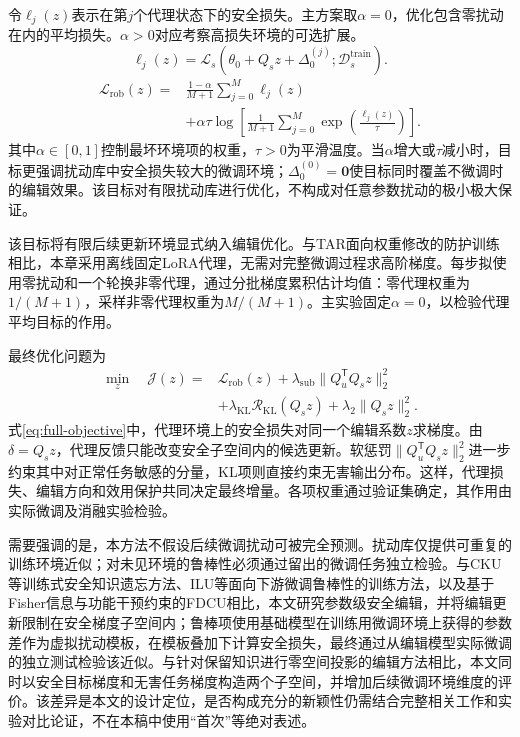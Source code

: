 令$\ell_j(z)$表示在第$j$个代理状态下的安全损失。主方案取$\alpha=0$，优化包含零扰动在内的平均损失。$\alpha>0$对应考察高损失环境的可选扩展。
\[
 \ell_j(z)=\mathcal L_s(\theta_0+Q_s z+\Delta_0^{(j)};\mathcal D_s^{\mathrm{train}}).
\]
\begin{equation}
 \begin{aligned}
  \mathcal L_{\mathrm{rob}}(z)
  ={}&\frac{1-\alpha}{M+1}\sum_{j=0}^{M}\ell_j(z)\\
  &+\alpha\tau\log\!\left[\frac1{M+1}
     \sum_{j=0}^{M}\exp\!\left(\frac{\ell_j(z)}{\tau}\right)\right].
 \end{aligned}
  \label{eq:robust-loss}
\end{equation}
其中$\alpha\in[0,1]$控制最坏环境项的权重，$\tau>0$为平滑温度。当$\alpha$增大或$\tau$减小时，目标更强调扰动库中安全损失较大的微调环境；$\Delta_{0}^{(0)}=\mathbf{0}$使目标同时覆盖不微调时的编辑效果。该目标对有限扰动库进行优化，不构成对任意参数扰动的极小极大保证。

该目标将有限后续更新环境显式纳入编辑优化。与TAR面向权重修改的防护训练相比\cite{tamirisa2024tar}，本章采用离线固定LoRA代理，无需对完整微调过程求高阶梯度。每步拟使用零扰动和一个轮换非零代理，通过分批梯度累积估计均值：零代理权重为$1/(M+1)$，采样非零代理权重为$M/(M+1)$。主实验固定$\alpha=0$，以检验代理平均目标的作用。

最终优化问题为
\begin{equation}
 \begin{aligned}
  \min_z\quad\mathcal J(z)={}&\mathcal L_{\mathrm{rob}}(z)
  +\lambda_{\mathrm{sub}}\|Q_u^{\mathsf T}Q_s z\|_2^2\\
  &+\lambda_{\mathrm{KL}}\mathcal R_{\mathrm{KL}}(Q_s z)
  +\lambda_2\|Q_s z\|_2^2.
 \end{aligned}
  \label{eq:full-objective}
\end{equation}
式\eqref{eq:full-objective}中，代理环境上的安全损失对同一个编辑系数$z$求梯度。由$\delta=Q_s z$，代理反馈只能改变安全子空间内的候选更新。软惩罚$\|Q_u^{\mathsf T}Q_s z\|_2^2$进一步约束其中对正常任务敏感的分量，KL项则直接约束无害输出分布。这样，代理损失、编辑方向和效用保护共同决定最终增量。各项权重通过验证集确定，其作用由实际微调及消融实验检验。

需要强调的是，本方法不假设后续微调扰动可被完全预测。扰动库仅提供可重复的训练环境近似；对未见环境的鲁棒性必须通过留出的微调任务独立检验。与CKU等训练式安全知识遗忘方法、ILU等面向下游微调鲁棒性的训练方法，以及基于Fisher信息与功能干预约束的FDCU相比，本文研究参数级安全编辑，并将编辑更新限制在安全梯度子空间内；鲁棒项使用基础模型在训练用微调环境上获得的参数差作为虚拟扰动模板，在模板叠加下计算安全损失，最终通过从编辑模型实际微调的独立测试检验该近似。与针对保留知识进行零空间投影的编辑方法相比，本文同时以安全目标梯度和无害任务梯度构造两个子空间，并增加后续微调环境维度的评价\cite{fang2024alphaedit,wang2025ilu,shi2025cku,li2026fdcu}。该差异是本文的设计定位，是否构成充分的新颖性仍需结合完整相关工作和实验对比论证，不在本稿中使用“首次”等绝对表述。

